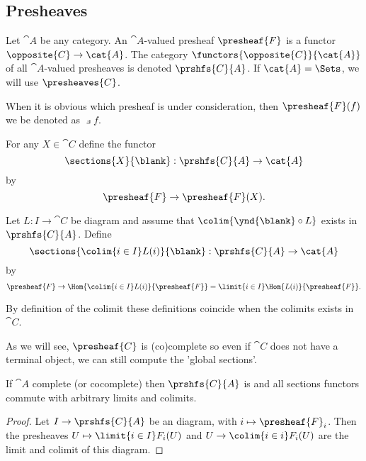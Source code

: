 \subsection{Presheaves}

\begin{definition}[Presheaves]
Let $\cat{A}$ be any category. An $\cat{A}$-valued presheaf $\presheaf{F}$ is a functor $\opposite{C} \rightarrow \cat{A}$. 
The category $\functors{\opposite{C}}{\cat{A}}$ of all $\cat{A}$-valued presheaves is denoted $\prshfs{C}{A}$. 
If $\cat{A} = \Sets$, we will use $\presheaves{C}$.
\end{definition}

When it is obvious which presheaf is under consideration, then $\presheaf{F}(f)$ 
we be denoted as $\pullback{f}$.
 
\begin{definition}
For any $X\in \cat{C}$ define the functor 
\[\sections{X}{\blank}:\prshfs{C}{A}\rightarrow \cat{A}\]
by
\[\presheaf{F} \rightarrow \presheaf{F}(X).\]

Let $L:I\rightarrow \cat{C}$ be diagram and assume that $\colim{\ynd{\blank}\circ L}$ exists in $\prshfs{C}{A}$.
Define 
\[\sections{\colim{i\in I}L(i)}{\blank}: \prshfs{C}{A} \rightarrow \cat{A}\]
by
\[\presheaf{F} \rightarrow \Hom{\colim{i\in I}L(i)}{\presheaf{F}} = \limit{i\in I}\Hom{L(i)}{\presheaf{F}}.\]

By definition of the colimit these definitions coincide when the colimits exists in $\cat{C}$.
\end{definition}

\begin{example}
As we will see, $\presheaf{C}$ is (co)complete so even if $\cat{C}$ does not have a terminal object, we can still compute the 'global sections'.
\end{example}


\begin{lemma}[Complete]
If $\cat{A}$ complete (or cocomplete) then $\prshfs{C}{A}$ is and all sections functors commute with arbitrary limits and colimits.
\end{lemma}
\begin{proof}
Let $I\rightarrow \prshfs{C}{A}$ be an diagram, with $i\mapsto \presheaf{F}_i$.
Then the presheaves $U\mapsto \limit{i\in I} F_i(U)$ and $U\rightarrow \colim{i \in i} F_i(U)$ are the limit and colimit of this diagram.
\end{proof}

